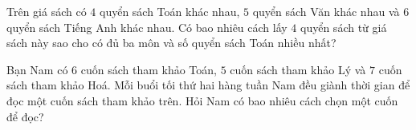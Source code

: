 \begin{bt}%
Trên giá sách có $4$ quyển sách Toán khác nhau, $5$ quyển sách Văn khác nhau và $6$ quyển sách Tiếng Anh khác nhau. Có bao nhiêu cách lấy $4$ quyển sách từ giá sách này sao cho có đủ ba môn và số quyển sách Toán nhiều nhất?
\end{bt}

\begin{bt}%
	Bạn Nam có $6$ cuốn sách tham khảo Toán, $5$ cuốn sách tham khảo Lý và $7$ cuốn sách tham khảo Hoá. Mỗi buổi tối thứ hai hàng tuần Nam đều giành thời gian để đọc một cuốn sách tham khảo trên. Hỏi Nam có bao nhiêu cách chọn một cuốn để đọc?
\end{bt}


